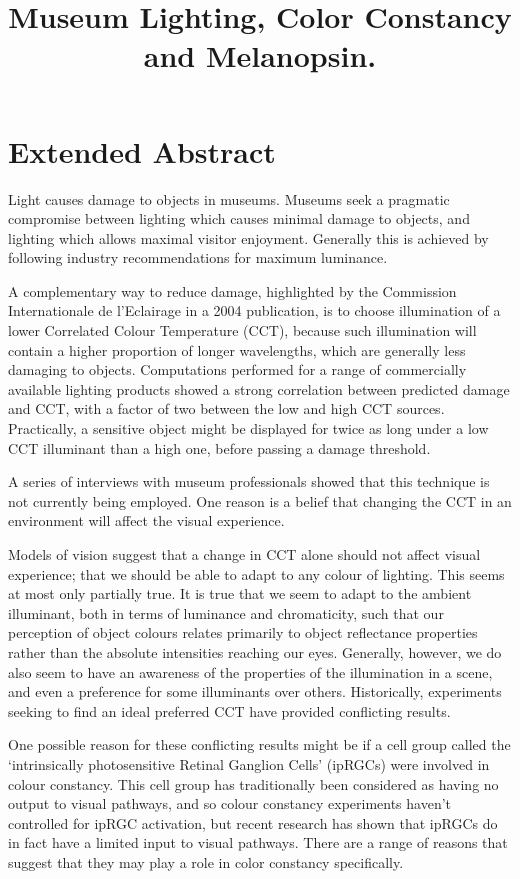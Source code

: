 \documentclass{article}
\title{Museum Lighting, Color Constancy and Melanopsin.}
\date{}
\begin{document}
\maketitle

\section{Extended Abstract}

Light causes damage to objects in museums. Museums seek a pragmatic compromise between lighting which causes minimal damage to objects, and lighting which allows maximal visitor enjoyment. Generally this is achieved by following industry recommendations for maximum luminance.

A complementary way to reduce damage, highlighted by the Commission Internationale de l'Eclairage in a 2004 publication, is to choose illumination of a lower Correlated Colour Temperature (CCT), because such illumination will contain a higher proportion of longer wavelengths, which are generally less damaging to objects. Computations performed for a range of commercially available lighting products showed a strong correlation between predicted damage and CCT, with a factor of two between the low and high CCT sources. Practically, a sensitive object might be displayed for twice as long under a low CCT illuminant than a high one, before passing a damage threshold. 

A series of interviews with museum professionals showed that this technique is not currently being employed. One reason is a belief that changing the CCT in an environment will affect the visual experience.

Models of vision suggest that a change in CCT alone should not affect visual experience; that we should be able to adapt to any colour of lighting. This seems at most only partially true. It is true that we seem to adapt to the ambient illuminant, both in terms of luminance and chromaticity, such that our perception of object colours relates primarily to object reflectance properties rather than the absolute intensities reaching our eyes. Generally, however, we do also seem to have an awareness of the properties of the illumination in a scene, and even a preference for some illuminants over others. Historically, experiments seeking to find an ideal preferred CCT have provided conflicting results.

One possible reason for these conflicting results might be if a cell group called the `intrinsically photosensitive Retinal Ganglion Cells' (ipRGCs) were involved in colour constancy. This cell group has traditionally been considered as having no output to visual pathways, and so colour constancy experiments haven't controlled for ipRGC activation, but recent research has shown that ipRGCs do in fact have a limited input to visual pathways. There are a range of reasons that suggest that they may play a role in color constancy specifically.
\end{document}
